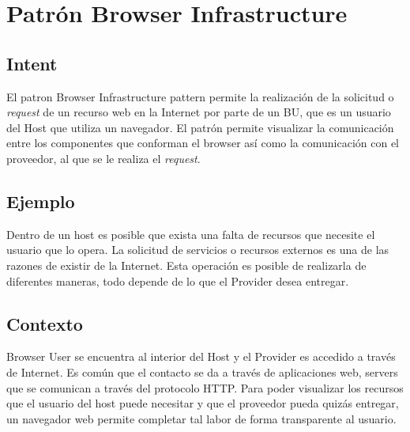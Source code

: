 \section{Patrón Browser Infrastructure}
\label{chap4:BrokerPatt}
\subsection{Intent}
El patron Browser Infrastructure pattern permite la realización de la solicitud o \textit{request} de un recurso web en la Internet por parte de un BU, que es un usuario del Host que utiliza un navegador. El patrón permite visualizar la comunicación entre los componentes que conforman el browser así como la comunicación con el proveedor, al que se le realiza el \textit{request}.

\subsection{Ejemplo}
Dentro de un host es posible que exista una falta de recursos que necesite el usuario que lo opera. La solicitud de servicios o recursos externos es una de las razones de existir de la Internet. Esta operación es posible de realizarla de diferentes maneras, todo depende de lo que el Provider desea entregar.

\subsection{Contexto}
Browser User se encuentra al interior del Host y el Provider es accedido a través de Internet.  Es común que el contacto se da a través de aplicaciones web, servers que se comunican a través del protocolo HTTP. Para poder visualizar los recursos que el usuario del host puede necesitar y que el proveedor pueda quizás entregar, un navegador web permite completar tal labor de forma transparente al usuario.

